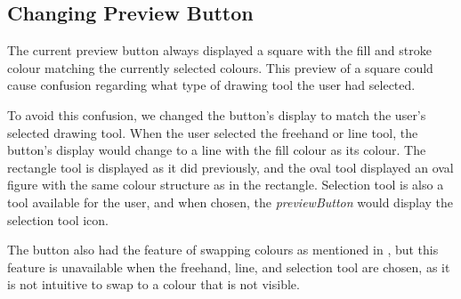 \subsection{Changing Preview Button}
The current preview button always displayed a square with the fill and stroke colour matching the currently selected colours.
This preview of a square could cause confusion regarding what type of drawing tool the user had selected.

To avoid this confusion, we changed the button's display to match the user's selected drawing tool.
When the user selected the freehand or line tool, the button's display would change to a line with the fill colour as its colour.
The rectangle tool is displayed as it did previously, and the oval tool displayed an oval figure with the same colour structure as in the rectangle.
Selection tool is also a tool available for the user, and when chosen, the \textit{previewButton} would display the selection tool icon.

The button also had the feature of swapping colours as mentioned in , but this feature is unavailable when the freehand, line, and selection tool are chosen, as it is not intuitive to swap to a colour that is not visible.
